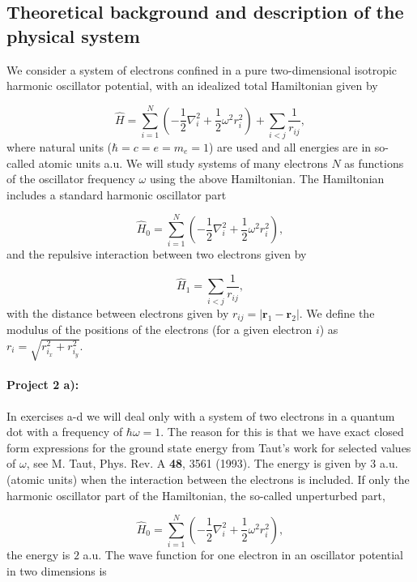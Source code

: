 \documentclass[%
oneside,                 %
final,                   %
10pt]{article}
\begin{document}
\subsection*{Theoretical background and description of the physical system}

We consider a system of electrons confined in a pure two-dimensional 
isotropic harmonic oscillator potential, with an idealized  total Hamiltonian given by

\begin{equation}
\label{eq:finalH}
\hat{H}=\sum_{i=1}^{N} \left(  -\frac{1}{2} \nabla_i^2 + \frac{1}{2} \omega^2r_i^2  \right)+\sum_{i<j}\frac{1}{r_{ij}},
\end{equation}
where natural units ($\hbar=c=e=m_e=1$) are used and all energies are in so-called atomic units a.u. We will study systems of many electrons $N$ as functions of the oscillator frequency  $\omega$ using the above Hamiltonian.  The Hamiltonian includes a standard harmonic oscillator part

\begin{equation*}
\hat{H}_0=\sum_{i=1}^{N} \left(  -\frac{1}{2} \nabla_i^2 + \frac{1}{2} \omega^2r_i^2  \right),
\end{equation*}
and the repulsive interaction between two electrons given by

\begin{equation*}
\hat{H}_1=\sum_{i<j}\frac{1}{r_{ij}},
\end{equation*}
with the distance between electrons given by $r_{ij}=\vert \bm{r}_1-\bm{r}_2\vert$. We define the 
modulus of the positions of the electrons (for a given electron $i$) as $r_i = \sqrt{r_{i_x}^2+r_{i_y}^2}$.

\paragraph{Project 2 a):}
In exercises a-d we will deal only with a system of
two electrons in a quantum dot with a frequency of $\hbar\omega = 1$. 
The reason for this is that we have exact closed form expressions 
for the ground state energy from Taut's work for selected values of $\omega$, 
see M. Taut, Phys. Rev. A \textbf{48}, 3561 (1993).
The energy is given by $3$ a.u.  (atomic units) when the interaction between the electrons is included.
If only the harmonic oscillator part of the Hamiltonian,
the so-called unperturbed part,

\begin{equation*} \hat{H}_0=\sum_{i=1}^{N} \left(  -\frac{1}{2} \nabla_i^2 + \frac{1}{2} \omega^2r_i^2  \right),\end{equation*}
the energy is $2$ a.u.
The wave function for one electron in an oscillator potential in two dimensions is
\end{document}
